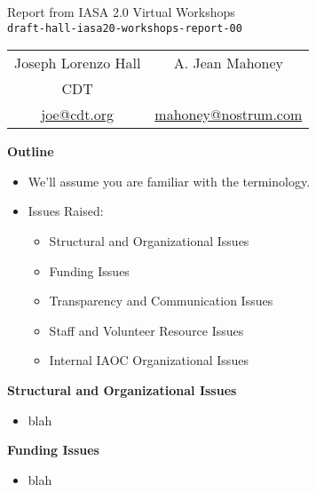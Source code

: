 \documentclass[helvetica]{seminar}
\newcommand{\heading}[1]{%
  \begin{center} 
    \large\bf 
    #1 
  \end{center} 
  \vspace{.4 in}}
\begin{document}
\begin{slide}
\begin{center}
\vspace{.5 in}
\LARGE{{\bf}Report from IASA 2.0 Virtual Workshops\\{\small \verb^draft-hall-iasa20-workshops-report-00^}}\\
\vspace{.2in}
\large{
\begin{tabular}{ c c }
Joseph Lorenzo Hall & A. Jean Mahoney\\
CDT & \\
\url{joe@cdt.org} & \url{mahoney@nostrum.com}
\end{tabular}
}
\end{center}
\end{slide}

\centerslidesfalse 

\begin{slide}
\heading{Outline}

\begin{itemize}
\item We'll assume you are familiar with the terminology.
\item Issues Raised:
  \begin{itemize}
  \item Structural and Organizational Issues
  \item Funding Issues
  \item Transparency and Communication Issues
  \item Staff and Volunteer Resource Issues
  \item Internal IAOC Organizational Issues
  \end{itemize}
\end{itemize}

\end{slide}

\begin{slide}
\heading{Structural and Organizational Issues}

\begin{itemize}
\item blah
\end{itemize}

\end{slide}

\begin{slide}
\heading{Funding Issues}

\begin{itemize}
\item blah
\end{itemize}

\end{slide}
\end{document}
